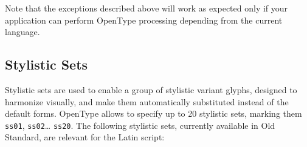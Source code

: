 Note that the exceptions described above will work as expected only if your
application can perform OpenType processing depending from the current
language.


\subsection{Stylistic Sets}

Stylistic sets are used to enable a group of stylistic variant glyphs,
designed to harmonize visually, and make them automatically substituted
instead of the default forms. OpenType allows to specify up to 20 stylistic
sets, marking them \texttt{ss01}, \texttt{ss02}\ldots{} \texttt{ss20}. The following stylistic sets, currently available in Old Standard, are relevant for the Latin script:

